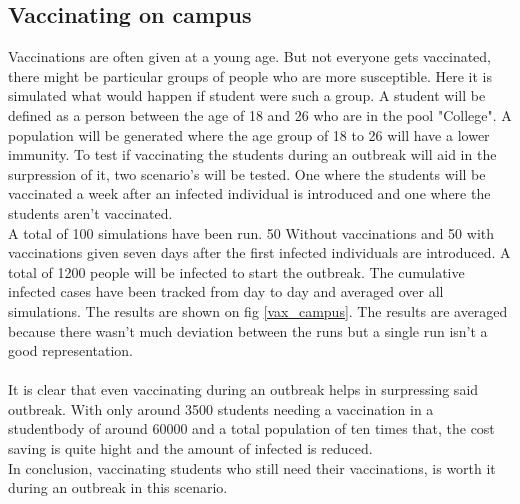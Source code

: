 \documentclass[runningheads]{llncs}
\begin{document}
	\subsection{Vaccinating on campus}
	Vaccinations are often given at a young age. But not everyone gets vaccinated, there might be particular groups of people who are more susceptible. Here it is simulated what would happen if student were such a group. A student will be defined as a person between the age of 18 and 26 who are in the pool "College". A population will be generated where the age group of 18 to 26 will have  a lower immunity. To test if vaccinating the students during an outbreak will aid in the surpression of it, two scenario's will be tested. One where the students will be vaccinated a week after an infected individual is introduced and one where the students aren't vaccinated.\\
	A total of 100 simulations have been run. 50 Without vaccinations and 50 with vaccinations given seven days after the first infected individuals are introduced. A total of 1200 people will be infected to start the outbreak. The cumulative infected cases have been tracked from day to day and averaged over all simulations. The results are shown on fig \ref{vax_campus}. The results are averaged because there wasn't much deviation between the runs but a single run isn't a good representation.\\ \\
	It is clear that even vaccinating during an outbreak helps in surpressing said outbreak. With only around 3500 students needing a vaccination in a studentbody of around 60000 and a total population of ten times that, the cost saving is quite hight and the amount of infected is reduced. \\
	In conclusion, vaccinating students who still need their vaccinations, is worth it during an outbreak in this scenario.
	
\end{document}
